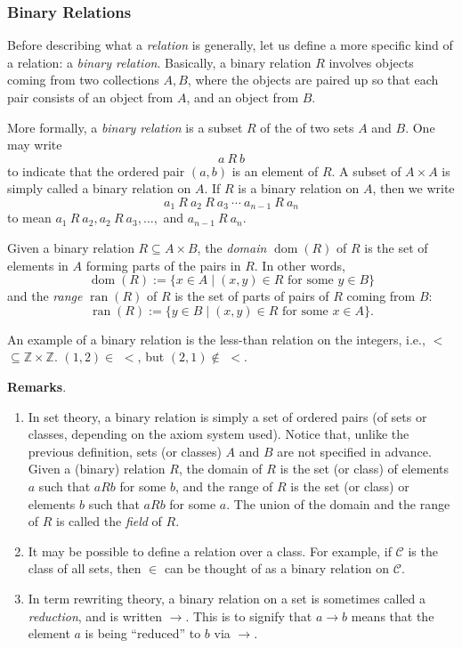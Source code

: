 \documentclass[12pt]{article}
\def\Z{\mathbb{Z}}
\begin{document}

\subsubsection*{Binary Relations}

Before describing what a \emph{relation} is generally, let us define a more specific kind of a relation: a \emph{binary relation}.  Basically, a binary relation $R$ involves objects coming from two collections $A,B$, where the objects are paired up so that each pair consists of an object from $A$, and an object from $B$.  

More formally, a \emph{binary relation} is a subset $R$ of the  of two sets $A$ and $B$.  One may write $$a\: R\: b$$ to indicate that the ordered pair $(a, b)$ is an element of $R$.  A subset of $A\times A$ is simply called a binary relation on $A$.  If $R$ is a binary relation on $A$, then we write $$a_1 \: R \: a_2 \: R \: a_3 \: \cdots \: a_{n-1} \: R \: a_n $$ to mean $a_1 \: R\: a_2, a_2\: R\: a_3, \ldots,$ and $a_{n-1}\: R \: a_n$.

Given a binary relation $R\subseteq A\times B$, the \emph{domain} $\operatorname{dom}(R)$ of $R$ is the set of elements in $A$ forming parts of the pairs in $R$.  In other words, $$\operatorname{dom}(R):=\lbrace x\in A\mid (x,y)\in R \mbox{ for some }y \in B \rbrace$$ and the \emph{range} $\operatorname{ran}(R)$ of $R$ is the set of parts of pairs of $R$ coming from $B$: $$\operatorname{ran}(R):=\lbrace y\in B\mid (x,y)\in R \mbox{ for some }x\in A \rbrace.$$

An example of a binary relation is the less-than relation on the integers, i.e.,
$<$ $\subseteq\Z\times\Z$.  $(1, 2) \in$ $<$, but $(2, 1) \notin$ $<$.

\textbf{Remarks}.  
\begin{enumerate}
\item
In set theory, a binary relation is simply a set of ordered pairs (of sets or classes, depending on the axiom system used).  Notice that, unlike the previous definition, sets (or classes) $A$ and $B$ are not specified in advance.  Given a (binary) relation $R$, the domain of $R$ is the set (or class) of elements $a$ such that $a R b$ for some $b$, and the range of $R$ is the set (or class) or elements $b$ such that $a R b$ for some $a$.  The union of the domain and the range of $R$ is called the \emph{field} of $R$.
\item
It may be possible to define a relation over a class.  For example, if $\mathcal{C}$ is the class of all sets, then $\in$ can be thought of as a binary relation on $\mathcal{C}$.
\item
In term rewriting theory, a binary relation on a set is sometimes called a \emph{reduction}, and is written $\to$.  This is to signify that $a\to b$ means that the element $a$ is being ``reduced'' to $b$ via $\to$.
\end{enumerate}
\end{document}

